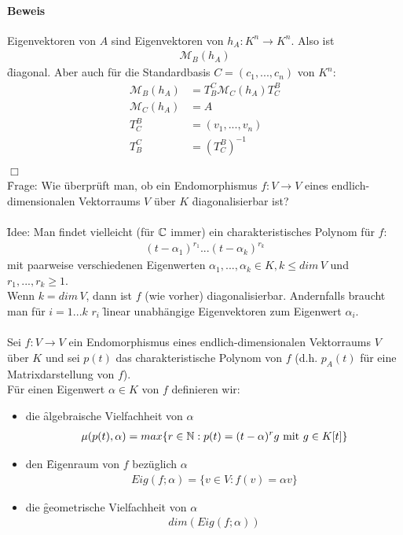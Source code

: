 \paragraph{Beweis}
Eigenvektoren von $A$ sind Eigenvektoren von $h_A: K^n \rightarrow K^n$. Also ist
\begin{align}
\mathcal{M}_B(h_A) 
\end{align}
\f{diagonal}. Aber auch für die Standardbasis $C = (c_1, ..., c_n)$ von $K^n$:
\begin{align}
\mathcal{M}_B(h_A) &= T_{B}^{C} \mathcal{M}_C(h_A) T_{C}^{B} \\
\mathcal{M}_C(h_A) &= A \\
T_{C}^{B} &= (v_1, ..., v_n) \\
T_{B}^{C} &= (T_{C}^{B})^{-1} \\
\end{align} \hfill $\Box$ \\
\f{Frage:} Wie überprüft man, ob ein Endomorphismus $f: V \rightarrow V$ eines endlich-dimensionalen Vektorraums $V$ über $K$ \f{diagonalisierbar} ist? \\\\
\f{Idee:} Man findet vielleicht (für $\mathbb{C}$ immer) ein charakteristisches Polynom für $f$:
\begin{align}
(t - \alpha_1)^{r_1}...(t-\alpha_k)^{r_k}
\end{align}
mit paarweise verschiedenen Eigenwerten $\alpha_1, ..., \alpha_k \in K, k \leq dim\, V$ und $r_1, ..., r_k \geq 1$. \\
Wenn $k = dim\, V$, dann ist $f$ (wie vorher) diagonalisierbar. Andernfalls braucht man für $i=1...k$ $r_i$ \f{linear unabhängige} Eigenvektoren zum Eigenwert $\alpha_i$. \\\\
Sei $f: V \rightarrow V$ ein Endomorphismus eines endlich-dimensionalen Vektorraums $V$ über $K$ und sei $p(t)$ das charakteristische Polynom von $f$ (d.h. $p_A(t)$ für eine Matrixdarstellung von $f$).\\
Für einen Eigenwert $\alpha \in K$ von $f$ definieren wir:
\begin{itemize}
\item die \f{algebraische Vielfachheit} von $\alpha$
\begin{align}
\mu(p(t), \alpha) = max\{r \in \mathbb{N}: p(t)=(t- \alpha)^r g \text{ mit } g \in K[t]\}
\end{align}
\item den \f{Eigenraum von $f$ bezüglich $\alpha$}
\begin{align}
Eig(f; \alpha) = \{v \in V: f(v) = \alpha v\}
\end{align}
\item die \f{geometrische Vielfachheit} von $\alpha$
\begin{align}
dim(Eig(f; \alpha))
\end{align}
\end{itemize}


